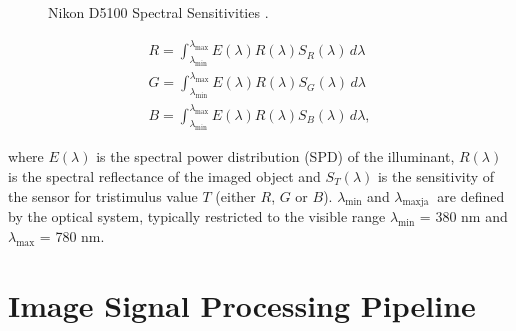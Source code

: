 \begin{figure}
    \centering
    \caption{Nikon D5100 Spectral Sensitivities  \cite{D5100NPL}.}
    \label{fig:d5100}
\end{figure}

\begin{subequations}
\begin{align}
\label{eq:sensor}
R = \int_{\lambda_{\text{min}}}^{\lambda_{\text{max}}} E(\lambda) R(\lambda) S_R(\lambda) \, d\lambda \\
G = \int_{\lambda_{\text{min}}}^{\lambda_{\text{max}}} E(\lambda) R(\lambda) S_G(\lambda) \, d\lambda \\
B = \int_{\lambda_{\text{min}}}^{\lambda_{\text{max}}} E(\lambda) R(\lambda) S_B(\lambda) \, d\lambda,
\end{align}

\end{subequations}

where $E(\lambda)$ is the spectral power distribution (SPD) of the illuminant, $R(\lambda)$ is the spectral reflectance of the imaged object and $S_T(\lambda)$ is the sensitivity of the sensor for tristimulus value $T$ (either $R$, $G$ or $B$). $\lambda_{\text{min}}$ and $\lambda_{\text{maxja }}$ are defined by the optical system, typically restricted to the visible range $\lambda_{\text{min}}$ = 380 nm and $\lambda_{\text{max}}$ = 780 nm.


\section{Image Signal Processing Pipeline}


